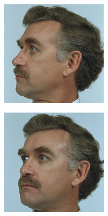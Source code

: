 \documentclass[xetex,aspectratio=169,xcolor,professionalfonts,hyperref]{beamer}
\begin{document}
\begin{frame}
{{\begin{figure}[hb]
\begin{subfigure}[b]{0.24\columnwidth}
            \includegraphics[width=\columnwidth]{figures/face2.png}
        \end{subfigure}
        \hfill
        \begin{subfigure}[b]{0.24\columnwidth}
            \centering
            \includegraphics[width=\columnwidth]{figures/face3.png}

\end{subfigure}
\end{figure}}}
\end{frame}
\end{document}
